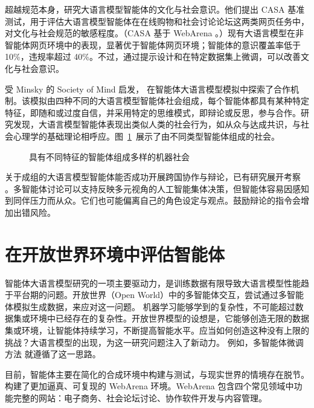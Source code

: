 \citet{qiu2024evaluating} 超越规范本身，研究大语言模型智能体的文化与社会意识。他们提出 CASA 基准测试，用于评估大语言模型智能体在在线购物和社会讨论论坛这两类网页任务中，对文化与社会规范的敏感程度。（CASA 基于 WebArena \citep{qi2024webrl}。）现有大语言模型在非智能体网页环境中的表现，显著优于智能体网页环境；智能体的意识覆盖率低于 10\%，违规率超过 40\%。不过，通过提示设计和在特定数据集上微调，可以改善文化与社会意识。

受 Minsky 的 Society of Mind \citep{minsky1988society} 启发，\citet{zhang2023exploring} 在智能体大语言模型模拟中探索了合作机制。该模拟由四种不同的大语言模型智能体社会组成，每个智能体都具有某种特定特征，即随和或过度自信，并采用特定的思维模式，即辩论或反思，参与合作。研究发现，大语言模型智能体表现出类似人类的社会行为，如从众与达成共识，与社会心理学的基础理论相呼应。图~\ref{fig:som}~展示了由不同类型智能体组成的社会。

\begin{figure}
  \begin{center}
    
    \caption{具有不同特征的智能体组成多样的机器社会 \citep{zhang2023exploring}}\label{fig:som}
  \end{center}
\end{figure}

关于成组的大语言模型智能体能否成功开展跨国协作与辩论，已有研究展开考察 \citep{baltaji2024conformity}。多智能体讨论可以支持反映多元视角的人工智能集体决策，但智能体容易因感知到同伴压力而从众。它们也可能偏离自己的角色设定与观点。鼓励辩论的指令会增加出错风险。

\section{在开放世界环境中评估智能体}\label{sec:openworld}
智能体大语言模型研究的一项主要驱动力，是训练数据有限导致大语言模型性能趋于平台期的问题。开放世界（Open World）中的多智能体交互，尝试通过多智能体模拟生成数据，来应对这一问题。
机器学习能够学到的复杂性，不可能超过数据集或环境中已经存在的复杂性。开放世界模型的设想是，它能够创造无限的数据集或环境，让智能体持续学习，不断提高智能水平。应当如何创造这种没有上限的挑战？大语言模型的出现，为这一研究问题注入了新动力。
例如，多智能体微调方法 \citep{subramaniam2025multiagent} 就遵循了这一思路。

目前，智能体主要在简化的合成环境中构建与测试，与现实世界的情境存在脱节。\citet{zhou2023webarena} 构建了更加逼真、可复现的 WebArena 环境。WebArena 包含四个常见领域中功能完整的网站：电子商务、社会论坛讨论、协作软件开发与内容管理。

